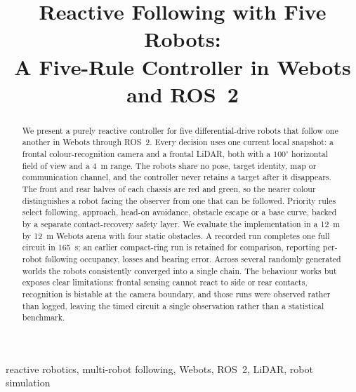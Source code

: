 \documentclass[conference,a4paper]{IEEEtran}
\begin{document}
\title{Reactive Following with Five Robots:\\
A Five-Rule Controller in Webots and ROS~2}

\author{
\and
{}
\and
{}
}

\maketitle

\begin{abstract}
We present a purely reactive controller for five differential-drive robots
that follow one another in Webots through ROS~2. Every decision uses one
current local snapshot: a frontal colour-recognition camera and a frontal
LiDAR, both with a $100^\circ$ horizontal field of view and a \SI{4}{\metre}
range. The robots share no pose, target identity, map or communication
channel, and the controller never retains a target after it disappears.
The front and rear halves of each chassis are red and green, so the nearer
colour distinguishes a robot facing the observer from one that can be
followed. Priority rules select following, approach, head-on avoidance,
obstacle escape or a base curve, backed by a separate contact-recovery
safety layer. We evaluate the implementation in a \SI{12}{\metre} by
\SI{12}{\metre} Webots arena with four static obstacles. A recorded run
completes one full circuit in \SI{165}{\second}; an earlier compact-ring run
is retained for comparison, reporting per-robot following occupancy, losses
and bearing error. Across several randomly generated worlds the robots consistently converged
into a single chain. The behaviour works but exposes clear limitations:
frontal sensing cannot react to side or rear contacts, recognition is
bistable at the camera boundary, and those runs were observed rather than
logged, leaving the timed circuit a single observation rather than a
statistical benchmark.
\end{abstract}
\begin{IEEEkeywords}
reactive robotics, multi-robot following, Webots, ROS~2, LiDAR, robot
simulation
\end{IEEEkeywords}
\end{document}
